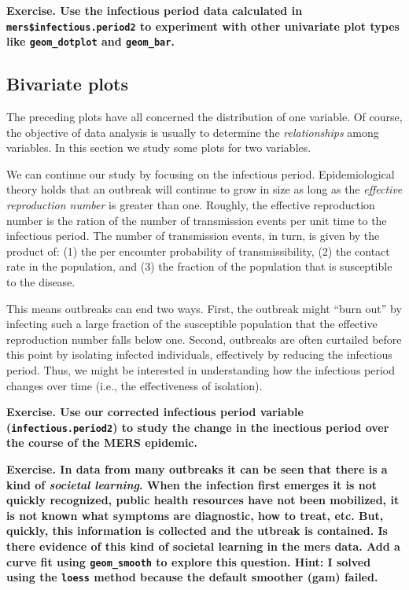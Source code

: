 \documentclass[]{article}
\begin{document}
\textbf{Exercise. Use the infectious period data calculated in
\texttt{mers\$infectious.period2} to experiment with other univariate
plot types like \texttt{geom\_dotplot} and \texttt{geom\_bar}.}

\hypertarget{bivariate-plots}{%
\subsection{Bivariate plots}\label{bivariate-plots}}

The preceding plots have all concerned the distribution of one variable.
Of course, the objective of data analysis is usually to determine the
\emph{relationships} among variables. In this section we study some
plots for two variables.

We can continue our study by focusing on the infectious period.
Epidemiological theory holds that an outbreak will continue to grow in
size as long as the \emph{effective reproduction number} is greater than
one. Roughly, the effective reproduction number is the ration of the
number of transmission events per unit time to the infectious period.
The number of transmission events, in turn, is given by the product of:
(1) the per encounter probability of transmissibility, (2) the contact
rate in the population, and (3) the fraction of the population that is
susceptible to the disease.

This means outbreaks can end two ways. First, the outbreak might ``burn
out'' by infecting such a large fraction of the susceptible population
that the effective reproduction number falls below one. Second,
outbreaks are often curtailed before this point by isolating infected
individuals, effectively by reducing the infectious period. Thus, we
might be interested in understanding how the infectious period changes
over time (i.e., the effectiveness of isolation).

\textbf{Exercise. Use our corrected infectious period variable
(\texttt{infectious.period2}) to study the change in the inectious
period over the course of the MERS epidemic.}

\textbf{Exercise. In data from many outbreaks it can be seen that there
is a kind of \emph{societal learning}. When the infection first emerges
it is not quickly recognized, public health resources have not been
mobilized, it is not known what symptoms are diagnostic, how to treat,
etc. But, quickly, this information is collected and the utbreak is
contained. Is there evidence of this kind of societal learning in the
mers data. Add a curve fit using \texttt{geom\_smooth} to explore this
question. Hint: I solved using the \texttt{loess} method because the
default smoother (gam) failed.}
\end{document}
